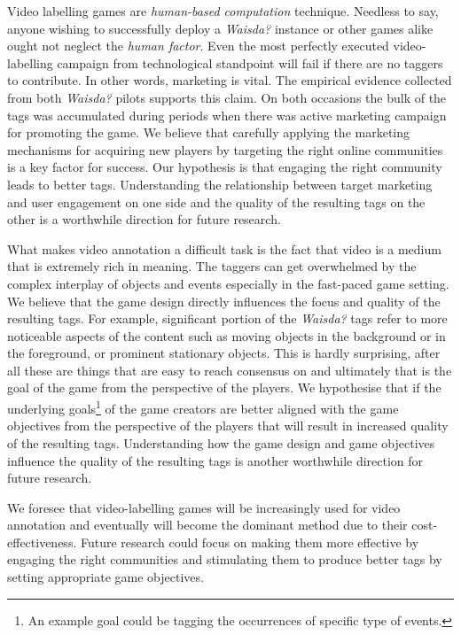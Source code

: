 
Video labelling games are \textit{human-based computation} technique. Needless to say, anyone wishing to successfully deploy a \textit{Waisda?} instance or other games alike ought not neglect the \textit{human factor}. Even the most perfectly executed video-labelling campaign from technological standpoint will fail if there are no taggers to contribute. In other words, marketing is vital. The empirical evidence collected from both \textit{Waisda?} pilots supports this claim. On both occasions the bulk of the tags was accumulated during periods when there was active marketing campaign for promoting the game. We believe that carefully applying the marketing mechanisms for acquiring new players by targeting the right online communities is a key factor for success. Our hypothesis is that engaging the right community leads to better tags. Understanding the relationship between target marketing and user engagement on one side and the quality of the resulting tags on the other is a worthwhile direction for future research.

What makes video annotation a difficult task is the fact that video is a medium that is extremely rich in meaning. The taggers can get overwhelmed by the complex interplay of objects and events especially in the fast-paced game setting. We believe that the game design directly influences the focus and quality of the resulting tags. For example, significant portion of the \textit{Waisda?} tags refer to more noticeable aspects of the content such as moving objects in the background or in the foreground, or prominent stationary objects. This is hardly surprising, after all these are things that are easy to reach consensus on and ultimately that is the goal of the game from the perspective of the players. We hypothesise that if the underlying goals\footnote{An example goal could be tagging the occurrences of specific type of events.} of the game creators are better aligned with the game objectives from the perspective of the players that will result in increased quality of the resulting tags. Understanding how the game design and game objectives influence the quality of the resulting tags is another worthwhile direction for future research. 

We foresee that video-labelling games will be increasingly used for video annotation and eventually will become the dominant method due to their cost-effectiveness. Future research could focus on making them more effective by engaging the right communities and stimulating them to produce better tags by setting appropriate game objectives.  






 